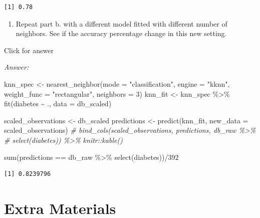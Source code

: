 \documentclass[
]{book}
\newenvironment{Shaded}{\begin{snugshade}}{\end{snugshade}}
\newcommand{\AttributeTok}[1]{\textcolor[rgb]{0.77,0.63,0.00}{#1}}
\newcommand{\CommentTok}[1]{\textcolor[rgb]{0.56,0.35,0.01}{\textit{#1}}}
\newcommand{\DecValTok}[1]{\textcolor[rgb]{0.00,0.00,0.81}{#1}}
\newcommand{\FunctionTok}[1]{\textcolor[rgb]{0.00,0.00,0.00}{#1}}
\newcommand{\NormalTok}[1]{#1}
\newcommand{\OtherTok}[1]{\textcolor[rgb]{0.56,0.35,0.01}{#1}}
\newcommand{\SpecialCharTok}[1]{\textcolor[rgb]{0.00,0.00,0.00}{#1}}
\newcommand{\StringTok}[1]{\textcolor[rgb]{0.31,0.60,0.02}{#1}}
\providecommand{\tightlist}{%
  \setlength{\itemsep}{0pt}\setlength{\parskip}{0pt}}
\begin{document}
\begin{verbatim}
[1] 0.78
\end{verbatim}

\begin{enumerate}
\def\labelenumi{\alph{enumi}.}
\setcounter{enumi}{2}
\tightlist
\item
  Repeat part b. with a different model fitted with different number of neighbors. See if the accuracy percentage change in this new setting.
\end{enumerate}

Click for answer

\emph{Answer:}

\begin{Shaded}
\begin{Highlighting}[]
\NormalTok{knn\_spec }\OtherTok{\textless{}{-}} \FunctionTok{nearest\_neighbor}\NormalTok{(}\AttributeTok{mode =} \StringTok{"classification"}\NormalTok{,}
                             \AttributeTok{engine =} \StringTok{"kknn"}\NormalTok{,}
                             \AttributeTok{weight\_func =} \StringTok{"rectangular"}\NormalTok{,}
                             \AttributeTok{neighbors =} \DecValTok{3}\NormalTok{)}
\NormalTok{knn\_fit }\OtherTok{\textless{}{-}}\NormalTok{ knn\_spec }\SpecialCharTok{\%\textgreater{}\%}
 \FunctionTok{fit}\NormalTok{(diabetes }\SpecialCharTok{\textasciitilde{}}\NormalTok{ ., }\AttributeTok{data =}\NormalTok{ db\_scaled)}

\NormalTok{scaled\_observations }\OtherTok{\textless{}{-}}\NormalTok{ db\_scaled}
\NormalTok{predictions }\OtherTok{\textless{}{-}} \FunctionTok{predict}\NormalTok{(knn\_fit, }\AttributeTok{new\_data =}\NormalTok{ scaled\_observations)}
\CommentTok{\# bind\_cols(scaled\_observations, predictions, db\_raw \%\textgreater{}\% }
\CommentTok{\#            select(diabetes)) \%\textgreater{}\% knitr::kable()}

\FunctionTok{sum}\NormalTok{(predictions }\SpecialCharTok{==}\NormalTok{ db\_raw }\SpecialCharTok{\%\textgreater{}\%} \FunctionTok{select}\NormalTok{(diabetes))}\SpecialCharTok{/}\DecValTok{392}
\end{Highlighting}
\end{Shaded}

\begin{verbatim}
[1] 0.8239796
\end{verbatim}

\hypertarget{part-extra-materials}{%
\part*{Extra Materials}\label{part-extra-materials}}
\end{document}

